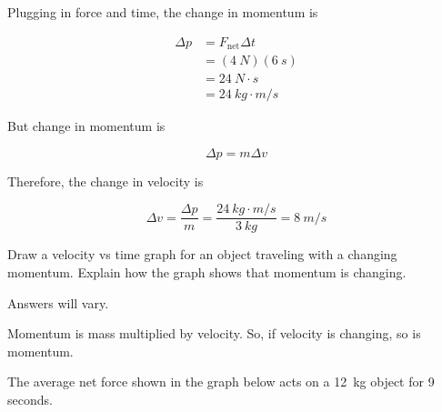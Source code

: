\documentclass[]{exam}
\begin{document}
\begin{questions}
\begin{solutionorbox}[3cm]
Plugging in force and time, the change in momentum is

\begin{align*}
    \Delta p &= F_\text{net} \Delta t \\[1ex]
    &= (\SI{4}{N})(\SI{6}{s}) \\[1ex]
    &= \SI{24}{N\cdot s} \\[1ex]
    &= \SI{24}{kg\cdot m/s}
\end{align*}

But change in momentum is

\begin{equation*}
    \Delta p = m \Delta v
\end{equation*}

Therefore, the change in velocity is

\begin{equation*}
    \Delta v = \frac{\Delta p}{m} = \frac{\SI{24}{kg\cdot m/s}}{\SI{3}{kg}} = \boxed{\SI{8}{m/s}}
\end{equation*}
\end{solutionorbox}

\question
Draw a velocity vs time graph for an object traveling with a changing momentum. Explain how the graph shows that momentum is changing.

\begin{solutionorbox}[4cm]
Answers will vary.

\begin{center}
\end{center}

Momentum is mass multiplied by velocity. So, if velocity is changing, so is momentum.
\end{solutionorbox}


\question
The average net force shown in the graph below acts on a \SI{12}{kg} object for 9 seconds.

\begin{center}
\end{center}


\end{questions}
\end{document}
